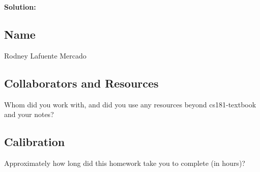 \documentclass[submit]{harvardml}
\begin{document}
\textbf{Solution:}

\newpage
\newpage
\newpage
\subsection*{Name}
Rodney Lafuente Mercado
\subsection*{Collaborators and Resources}
Whom did you work with, and did you use any resources beyond cs181-textbook and your notes?
\subsection*{Calibration}
Approximately how long did this homework take you to complete (in hours)? 
\end{document}
